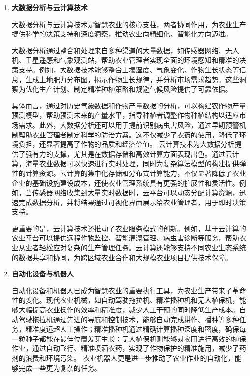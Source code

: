\begin{enumerate}[(1)]
    更进一步地，人工智能还可以结合无人机、传感器网络和物联网平台，为大规模农业生产提供端到端的智能化支持。例如，无人机搭载AI视觉系统，可以高空监测作物生长状况，并生成全田地的健康评估报告，为农场管理提供数据支撑。
    人工智能的智能预测和决策能力，不仅显著提高了农业生产效率，还大幅减少了资源浪费，使农业生产更加环保和可持续化。通过AI技术的深入应用，智慧农业正在实现从经验驱动向数据和算法驱动的根本转变，为现代农业发展注入了强大的技术动力。

  \item \textbf{大数据分析与云计算技术}
  
    大数据分析与云计算技术是智慧农业的核心支柱，两者协同作用，为农业生产提供科学的决策支持和深度洞察，推动农业向精细化、智能化方向迈进。
    
    大数据分析通过整合和处理来自多种渠道的大量数据，如传感器网络、无人机、卫星遥感和气象观测站，帮助农业管理者实现全面的环境感知和精准的决策支持。例如，大数据技术能够整合土壤湿度、气象变化、作物生长状态等信息，生成土地肥力分布图，揭示作物生长规律，并分析市场需求趋势。这些洞察为优化生产计划、制定精准种植策略和规避气候风险提供了可靠依据。
    
    具体而言，通过对历史气象数据和作物产量数据的分析，可以构建农作物产量预测模型，帮助预测未来的产量水平，指导种植者调整作物种植结构以适应市场需求。此外，大数据分析还可以用于提前识别病虫害风险，通过早期预警机制帮助农业管理者制定科学的防治方案。这不仅减少了农药的使用，降低了环境负担，还显著提高了作物的品质和经济价值。
    云计算技术为大数据分析提供了强有力的支撑，尤其是在数据存储和高效计算方面表现出色。通过云计算，海量农业数据可以快速进行实时处理，同时为复杂算法模型的构建提供弹性的计算资源。云计算的集中化存储和分布式计算能力，不仅显著降低了农业企业的基础设施建设成本，还使农业管理系统具有更强的扩展性和灵活性。例如，当传感器网络收集到大量实时数据时，云平台可以动态分配计算资源，迅速完成数据分析，并将结果通过可视化界面展示给农业管理者，用于即时决策支持。
    
    更重要的是，云计算技术还推动了农业服务模式的创新。例如，基于云计算的农业平台可以提供远程作物监控、智能灌溉管理、病虫害诊断等服务，帮助农业从业者轻松应对复杂的生产管理任务。云计算还能够支持不同农业生态系统的数据共享和协同，为跨区域农业合作和大规模农业项目提供技术保障。
\item \textbf{自动化设备与机器人} 

    自动化设备和机器人已成为智慧农业的重要执行工具，为农业生产带来了革命性的变化。现代农业机械，如自动驾驶拖拉机、精准播种机和无人植保机，能够大幅提高农业操作的效率和精准度，减少人工干预的同时降低生产成本。自动驾驶拖拉机通过先进的导航和控制技术，能够自动完成耕作、播种等多种任务，精准度远超人工操作；精准播种机通过精确计算播种深度和密度，确保每一粒种子都能在最佳位置发芽生长；无人植保机则能够对农田进行高效的植保作业，通过自动飞行、精准喷洒农药，实现了作物保护的精准施用，减少了药剂的浪费和环境污染。 农业机器人更是进一步推动了农业作业的自动化，能够完成一些更为复杂的任务。


\end{enumerate}

